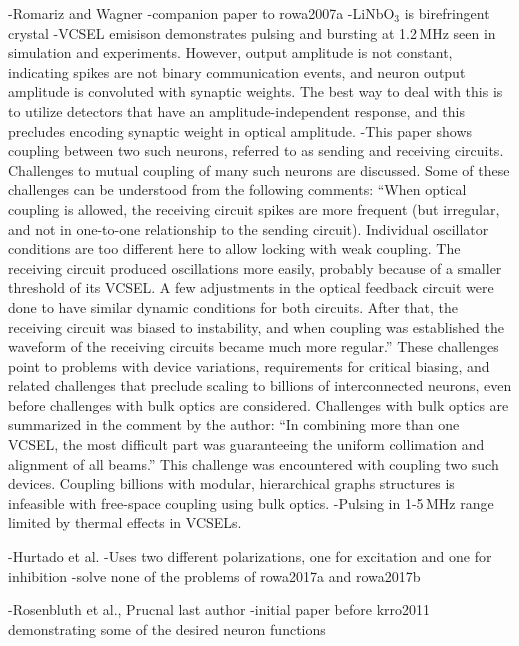 \cite{rowa2007b}
-Romariz and Wagner
-companion paper to rowa2007a
-LiNbO$_3$ is birefringent crystal
-VCSEL emisison demonstrates pulsing and bursting at 1.2\,MHz seen in simulation and experiments. However, output amplitude is not constant, indicating spikes are not binary communication events, and neuron output amplitude is convoluted with synaptic weights. The best way to deal with this is to utilize detectors that have an amplitude-independent response, and this precludes encoding synaptic weight in optical amplitude.
-This paper shows coupling between two such neurons, referred to as sending and receiving circuits. Challenges to mutual coupling of many such neurons are discussed. Some of these challenges can be understood from the following comments: ``When optical coupling is allowed, the receiving circuit spikes are more frequent (but irregular, and not in one-to-one relationship to the sending circuit). Individual oscillator conditions are too different here to allow locking with weak coupling. The receiving circuit produced oscillations more easily, probably because of a smaller threshold of its VCSEL. A few adjustments in the optical feedback circuit were done to have similar dynamic conditions for both circuits. After that, the receiving circuit was biased to instability, and when coupling was established the waveform of the receiving circuits became much more regular.'' These challenges point to problems with device variations, requirements for critical biasing, and related challenges that preclude scaling to billions of interconnected neurons, even before challenges with bulk optics are considered. Challenges with bulk optics are summarized in the comment by the author: ``In combining more than one VCSEL, the most difficult part was guaranteeing the uniform collimation and alignment of all beams.'' This challenge was encountered with coupling two such devices. Coupling billions with modular, hierarchical graphs structures is infeasible with free-space coupling using bulk optics.
-Pulsing in 1-5\,MHz range limited by thermal effects in VCSELs.

\cite{huhe2010}
-Hurtado et al.
-Uses two different polarizations, one for excitation and one for inhibition
-solve none of the problems of rowa2017a and rowa2017b

\cite{rokr2009}
-Rosenbluth et al., Prucnal last author
-initial paper before krro2011 demonstrating some of the desired neuron functions

